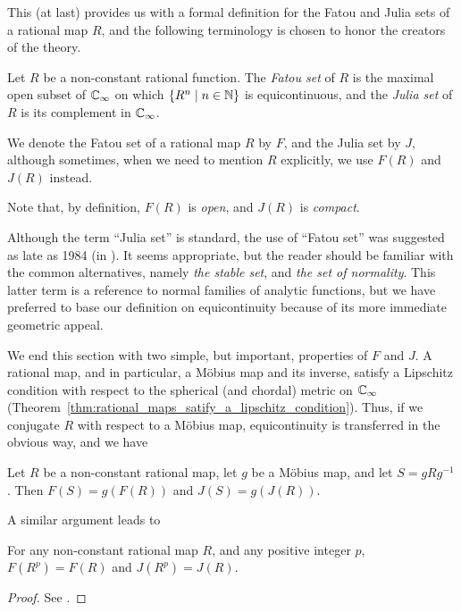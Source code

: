 This (at last) provides us with a formal definition for the Fatou and Julia sets
of a rational map $R$, and the following terminology is chosen to honor the
creators of the theory.

\begin{definition}
    Let $R$ be a non-constant rational function. The \emph{Fatou set} of $R$ is
    the maximal open subset of $\mathbb{C}_\infty$ on which $\{R^n \mid n \in \mathbb{N}\}$ is
    equicontinuous, and the \emph{Julia set} of $R$ is its complement in
    $\mathbb{C}_\infty$.

    We denote the Fatou set of a rational map $R$ by $F$, and the Julia set by
    $J$, although sometimes, when we need to mention $R$ explicitly, we use
    $F(R)$ and $J(R)$ instead.
\end{definition}

\begin{remark}
    Note that, by definition, $F(R)$ is \emph{open}, and $J(R)$ is
    \emph{compact}.
\end{remark}

Although the term \enquote{Julia set} is standard, the use of \enquote{Fatou
set} was suggested as late as 1984 (in \cite{Blanchard1984}). It seems
appropriate, but the reader should be familiar with the common alternatives,
namely \emph{the stable set}, and \emph{the set of normality}. This latter term
is a reference to normal families of analytic functions, but we have preferred
to base our definition on equicontinuity because of its more immediate geometric
appeal.

We end this section with two simple, but important, properties of $F$ and $J$. A
rational map, and in particular, a Möbius map and its inverse, satisfy a
Lipschitz condition with respect to the spherical (and chordal) metric on
$\mathbb{C}_\infty$ (Theorem~\ref{thm:rational_maps_satify_a_lipschitz_condition}). Thus, if
we conjugate $R$ with respect to a Möbius map, equicontinuity is transferred in
the obvious way, and we have

\begin{theorem}
    Let $R$ be a non-constant rational map, let $g$ be a Möbius map, and let $S
    = g R g^{-1}$. Then $F(S) = g(F(R))$ and $J(S) = g(J(R))$.
\end{theorem}

A similar argument leads to

\begin{theorem}
    \label{thm:F_and_J_are_preserved_under_iteration}
    For any non-constant rational map $R$, and any positive integer $p$, $F(R^p)
    = F(R)$ and $J(R^p) = J(R)$.
\end{theorem}
\begin{proof}
    See \cite[51]{Beardon1991}.
\end{proof}

